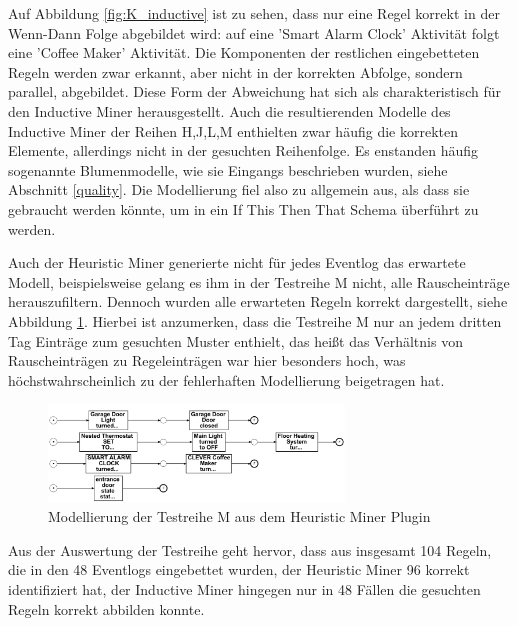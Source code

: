 Auf Abbildung \ref{fig:K_inductive} ist zu sehen, dass nur eine Regel korrekt in der Wenn-Dann Folge abgebildet wird: auf eine 'Smart Alarm Clock' Aktivität folgt eine 'Coffee Maker' Aktivität. 
Die Komponenten der restlichen eingebetteten Regeln werden zwar erkannt, aber nicht in der korrekten Abfolge, sondern parallel, abgebildet. Diese Form der Abweichung hat sich als charakteristisch für den Inductive Miner herausgestellt. Auch die resultierenden Modelle des Inductive Miner der Reihen H,J,L,M enthielten zwar häufig  die korrekten Elemente, allerdings nicht in der gesuchten Reihenfolge. Es enstanden häufig sogenannte Blumenmodelle, wie sie Eingangs beschrieben wurden, siehe Abschnitt \ref{quality}. Die Modellierung fiel also zu allgemein aus, als dass sie gebraucht werden könnte, um in ein If This Then That Schema überführt zu werden.

Auch der Heuristic Miner generierte nicht für jedes Eventlog das erwartete Modell, beispielsweise gelang es ihm in der Testreihe M nicht, alle Rauscheinträge herauszufiltern. Dennoch wurden alle erwarteten Regeln korrekt dargestellt, siehe Abbildung \ref{fig:M_heuristic}. 
Hierbei ist anzumerken, dass die Testreihe M nur an jedem dritten Tag Einträge zum gesuchten Muster enthielt, das heißt das Verhältnis von Rauscheinträgen zu Regeleinträgen war hier besonders hoch, was höchstwahrscheinlich zu der fehlerhaften Modellierung beigetragen hat.
\begin{figure}[!ht]
    \centering
    \includegraphics[width=0.7\textwidth,]{figures/Appbildungen/M_Heuristic.PNG}
    \caption{Modellierung der Testreihe M aus dem Heuristic Miner Plugin}
    \label{fig:M_heuristic}
\end{figure}

Aus der Auswertung der Testreihe geht hervor, dass aus insgesamt 104 Regeln, die in den 48 Eventlogs eingebettet wurden, der Heuristic Miner 96 korrekt identifiziert hat, der Inductive Miner hingegen nur in 48 Fällen die gesuchten Regeln korrekt abbilden konnte.

